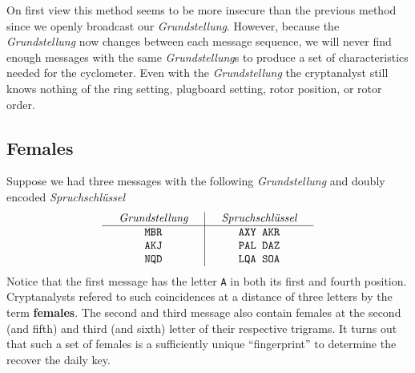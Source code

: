 On first view this method seems to be more insecure than the previous method since we openly broadcast our \emph{Grundstellung}. However, because the \emph{Grundstellung} now changes between each message sequence, we will never find enough messages with the same \emph{Grundstellung}s to produce a set of characteristics needed for the cyclometer. Even with the \emph{Grundstellung} the cryptanalyst still knows nothing of the ring setting, plugboard setting, rotor position, or rotor order.

\subsection{Females}
Suppose we had three messages with the following \emph{Grundstellung} and doubly encoded \emph{Spruchschlüssel}
\[
	\setlength{\arraycolsep}{15pt}
	\begin{array}{c | c}
		\emph{Grundstellung} & \emph{Spruchschlüssel} \\
		\hline
		\texttt{MBR}         & \texttt{AXY AKR}       \\
		\texttt{AKJ}         & \texttt{PAL DAZ}       \\
		\texttt{NQD}         & \texttt{LQA SOA}
	\end{array}
\]
Notice that the first message has the letter \texttt{A} in both its first and fourth position. Cryptanalysts refered to such coincidences at a distance of three letters by the term {\bf{females}}. The second and third message also contain females at the second (and fifth) and third (and sixth) letter of their respective trigrams. It turns out that such a set of females is a sufficiently unique ``fingerprint'' to determine the recover the daily key.
